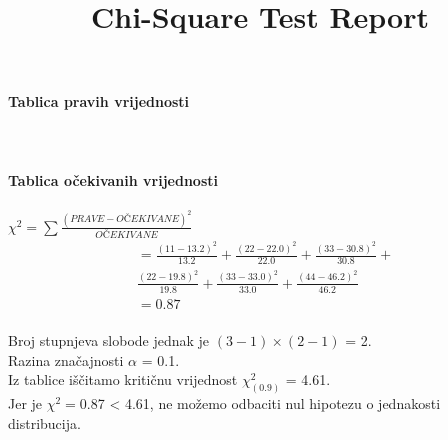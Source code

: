 \documentclass{article}%
\begin{document}
%
\normalsize%
\title{Chi-Square Test Report}%
\renewcommand{\arraystretch}{1.5}%
\textbf{\huge Tablica pravih vrijednosti\\}%
%
\\\\\\%
\renewcommand{\arraystretch}{1.5}%
\textbf{\huge Tablica očekivanih vrijednosti}\\%
%
\vspace{10pt}%
\\[1em]%
\Large $\chi^2 = \sum \frac{(PRAVE - OČEKIVANE)^2}{OČEKIVANE}$%
\\[1em]%
\begin{equation*}%
\begin{aligned}%
&=%
 \frac{(11 - 13.2)^2}{13.2} +%
 \frac{(22 - 22.0)^2}{22.0} +%
 \frac{(33 - 30.8)^2}{30.8} + \\&%
 \frac{(22 - 19.8)^2}{19.8} +%
 \frac{(33 - 33.0)^2}{33.0} +%
 \frac{(44 - 46.2)^2}{46.2} \\&%
=0.87%
\end{aligned}%
\end{equation*}%
\vspace{10pt}%
\\[1em]%
\Large Broj stupnjeva slobode jednak je $(3 - 1) \times (2 - 1)$ = 2.%
\\%
\Large Razina značajnosti $\alpha$ = 0.1.%
\\%
\Large Iz tablice iščitamo kritičnu vrijednost $\chi^2_{(0.9)}$ = 4.61.%
\\%
\Large Jer je $\chi^2=$0.87 < 4.61, ne možemo odbaciti nul hipotezu o jednakosti distribucija.%
\end{document}
